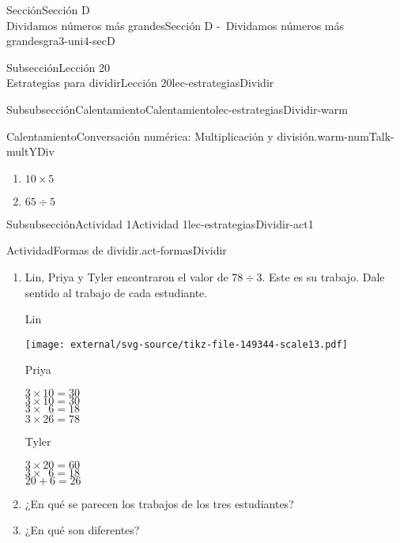 \begin{sectionptx}{Sección}{{\Large Sección D\\}Dividamos números más grandes}{}{Sección D -~Dividamos números más grandes}{}{}{gra3-uni4-secD}
\begin{subsectionptx}{Subsección}{{\normalsize Lección 20\\[-0.05cm]}Estrategias para dividir}{}{Lección 20}{}{}{lec-estrategiasDividir}
\begin{subsubsectionptx}{Subsubsección}{Calentamiento}{}{Calentamiento}{}{}{lec-estrategiasDividir-warm}
\begin{exploration}{Calentamiento}{Conversación numérica: Multiplicación y división.}{warm-numTalk-multYDiv}
\begin{enumerate}[label={\Alph*.}]
\item{}\(\displaystyle 10\times 5\)%
\item{}\(\displaystyle 65\div 5\)%
\end{enumerate}
\end{exploration}%
\end{subsubsectionptx}
%
%
\typeout{************************************************}
\typeout{************************************************}
%
\begin{subsubsectionptx}{Subsubsección}{Actividad 1}{}{Actividad 1}{}{}{lec-estrategiasDividir-act1}
\begin{activity}{Actividad}{Formas de dividir.}{act-formasDividir}%
%
\begin{enumerate}
\item{}Lin, Priya y Tyler encontraron el valor de \(78 \div 3\). Este es su trabajo. Dale sentido al trabajo de cada estudiante.%
\par
Lin%
\par
\begin{image}{0}{1}{0}{}%
\texttt{[image: external/svg-source/tikz-file-149344-scale13.pdf]}
\end{image}%
%
\begin{sidebyside}{2}{0}{0}{0}%
\begin{sbspanel}{0.5}%
Priya%
\par
\(3\times 10 = 30\)\\
 \(3\times 10 = 30\)\\
 \(3\times \phantom{0}6 = 18\)\\
 \(\overline {3 \times 26 =78}\)%
\end{sbspanel}%
\begin{sbspanel}{0.5}%
Tyler%
\par
\(3\times 20 = 60\)\\
 \(3\times \phantom{0}6 = 18\)\\
 \(20 + 6 = 26\)%
\end{sbspanel}%
\end{sidebyside}%
\item{}¿En qué se parecen los trabajos de los tres estudiantes?%
\item{}¿En qué son diferentes?%
\end{enumerate}
\end{activity}%
\end{subsubsectionptx}
%
%
\typeout{************************************************}
\typeout{************************************************}

\end{subsectionptx}
\end{sectionptx}
